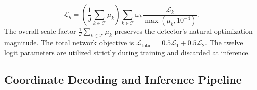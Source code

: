 \begin{equation}
    \mathcal{L}_g = \left(\frac{1}{J}\sum_{k \in \mathcal{T}} \mu_k\right) \sum_{k \in \mathcal{T}} \omega_k \frac{\mathcal{L}_k}{\max(\mu_k, 10^{-4})}.
    \label{eq:balanced_loss}
\end{equation}
The overall scale factor $\frac{1}{J}\sum_{k \in \mathcal{T}} \mu_k$ preserves the detector's natural optimization magnitude. The total network objective is $\mathcal{L}_{\mathrm{total}} = 0.5\mathcal{L}_1 + 0.5\mathcal{L}_2$. The twelve logit parameters are utilized strictly during training and discarded at inference.


\subsection{Coordinate Decoding and Inference Pipeline}
\label{sec:decoding_and_pipeline}

